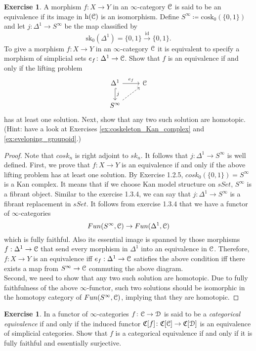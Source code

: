 \documentclass[10pt,a4paper,reqno,oneside]{book} %
\theoremstyle{plain}
\theoremstyle{definition}
\newtheorem{exercise}[thm]{Exercise}
\theoremstyle{remark}
\numberwithin{equation}{section}
\begin{document}
\begin{exercise} \label{ex:equivalences_S_infty}
	A morphism $f \colon X \to Y$ in an $\infty$-category $\mathcal C$ is said to be an equivalence if its image in $\mathrm h(\mathcal C)$ is an isomorphism.
	Define $S^\infty \coloneqq \mathrm{cosk}_0(\{0,1\})$ and let $j \colon \Delta^1 \to S^\infty$ be the map classified by
	\[ \mathrm{sk}_0(\Delta^1) = \{0,1\} \xrightarrow{\mathrm{id}} \{0,1\} . \]
	To give a morphism $f \colon X \to Y$ in an $\infty$-category $\mathcal C$ it is equivalent to specify a morphism of simplicial sets $e_f \colon \Delta^1 \to \mathcal C$.
	Show that $f$ is an equivalence if and only if the lifting problem
	\[ \begin{tikzcd}
		\Delta^1 \arrow[hook]{d}{j} \arrow{r}{e_f} & \cC \\
		S^\infty \arrow[dashed]{ur}
	\end{tikzcd} \]
	has at least one solution.
	Next, show that any two such solution are homotopic.
	(Hint: have a look at Exercises \ref{ex:coskeleton_Kan_complex} and \ref{ex:eveloping_groupoid}.)
\end{exercise}

\begin{proof}
    Note that $cosk_n$ is right adjoint to $sk_n$. It follows that $j:\Delta^1 \to S^{\infty}$ is well defined. First, we prove that $f:X \to Y$ is an equivalence if and only if the above lifting problem has at least one solution. By Exercise 1.2.5, $cosk_0(\{0,1\})=S^{\infty}$ is a Kan complex. It means that if we choose Kan model structure on $sSet$, $S^{\infty}$ is a fibrant object. Similar to the exercise 1.3.4, we can say that $j:\Delta^1 \to S^{\infty}$ is a fibrant replacement in $sSet$. It follows from exercise 1.3.4 that we have a functor of $\infty$-categories 
    \[ Fun(S^{\infty}, \mathcal C) \to Fun(\Delta^1, \mathcal C)\]
    which is fully faithful. Also its essential image is spanned by those morphisms $f:\Delta^1 \to \mathcal C$ that send every morphism in $\Delta^1$ into an equivalence in $\mathcal C$. Therefore, $f:X \to Y$ is an equivalence iff $e_f:\Delta^1 \to \mathcal C$ satisfies the above condition iff there exists a map from $S^{\infty} \to \mathcal C$ commuting the above diagram. \\
    Second, we need to show that any two such solution are homotopic. Due to fully faithfulness of the above $\infty$-functor, such two solutions should be isomorphic in the homotopy category of $Fun(S^{\infty}, \mathcal C)$, implying that they are homotopic.
\end{proof}

\begin{exercise}
	In \cite{HTT} a functor of $\infty$-categories $f \colon \mathcal C \to \mathcal D$ is said to be a \emph{categorical equivalence} if and only if the induced functor $\mathfrak C[f] \colon \mathfrak C[\mathcal C] \to \mathfrak C[\mathcal D]$ is an equivalence of simplicial categories.
	Show that $f$ is a categorical equivalence if and only if it is fully faithful and essentially surjective.
\end{exercise}
\end{document}
